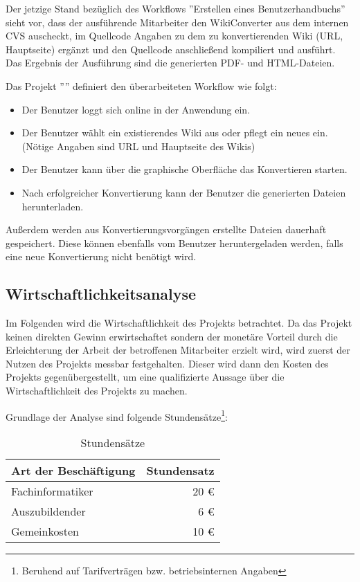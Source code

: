 \documentclass[12pt, xcolor=dvipsnames]{scrartcl}
\begin{document}
Der jetzige Stand bezüglich des Workflows ''Erstellen eines Benutzerhandbuchs'' sieht vor, dass der ausführende Mitarbeiter den WikiConverter aus dem internen CVS auscheckt, im Quellcode Angaben zu dem zu konvertierenden Wiki (URL, Hauptseite) ergänzt und den Quellcode anschließend kompiliert und ausführt. Das Ergebnis der Ausführung sind die generierten PDF- und HTML-Dateien.

Das Projekt ''\Projekt'' definiert den überarbeiteten Workflow wie folgt:

\begin{itemize}
	\item Der Benutzer loggt sich online in der Anwendung ein.
	\item Der Benutzer wählt ein existierendes Wiki aus oder pflegt ein neues ein. (Nötige Angaben sind URL und Hauptseite des Wikis)
	\item Der Benutzer kann über die graphische Oberfläche das Konvertieren starten.
	\item Nach erfolgreicher Konvertierung kann der Benutzer die generierten Dateien herunterladen.
\end{itemize}

Außerdem werden aus Konvertierungsvorgängen erstellte Dateien dauerhaft gespeichert. Diese können ebenfalls vom Benutzer heruntergeladen werden, falls eine neue Konvertierung nicht benötigt wird.

\subsection{Wirtschaftlichkeitsanalyse}
\label{sec:wirtschaftlichkeitsanalyse}

Im Folgenden wird die Wirtschaftlichkeit des Projekts betrachtet. Da das Projekt keinen direkten Gewinn erwirtschaftet sondern der monetäre Vorteil durch die Erleichterung der Arbeit der betroffenen Mitarbeiter erzielt wird, wird zuerst der Nutzen des Projekts messbar festgehalten. Dieser wird dann den Kosten des Projekts gegenübergestellt, um eine qualifizierte Aussage über die Wirtschaftlichkeit des Projekts zu machen.

Grundlage der Analyse sind folgende Stundensätze\footnote{Beruhend auf Tarifverträgen bzw. betriebsinternen Angaben}:

\begin{table}[H]
	\centering
	\begin{tabular}{lr}

		\rowcolor{white!15}				
		\textbf{Art der Beschäftigung} & \textbf{Stundensatz} \\\hline		
		
		Fachinformatiker & 20 \euro \\
		Auszubildender & 6 \euro \\
		Gemeinkosten & 10 \euro \\
			    
	\end{tabular}
	\caption{Stundensätze}
	\label{tab:stundensätze}
\end{table}
\end{document}

